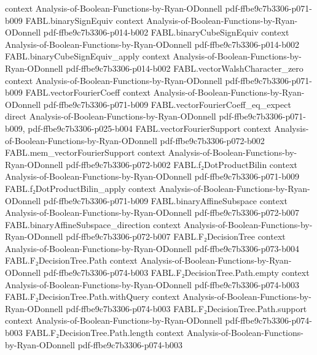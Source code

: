 \begin{theorem}
  {context}
  {Analysis-of-Boolean-Functions-by-Ryan-ODonnell}
  {pdf-ffbe9c7b3306-p071-b009}
\proofstep
  {FABL.binarySignEquiv}
  {context}
  {Analysis-of-Boolean-Functions-by-Ryan-ODonnell}
  {pdf-ffbe9c7b3306-p014-b002}
\proofstep
  {FABL.binaryCubeSignEquiv}
  {context}
  {Analysis-of-Boolean-Functions-by-Ryan-ODonnell}
  {pdf-ffbe9c7b3306-p014-b002}
\proofstep
  {FABL.binaryCubeSignEquiv_apply}
  {context}
  {Analysis-of-Boolean-Functions-by-Ryan-ODonnell}
  {pdf-ffbe9c7b3306-p014-b002}
\proofstep
  {FABL.vectorWalshCharacter_zero}
  {context}
  {Analysis-of-Boolean-Functions-by-Ryan-ODonnell}
  {pdf-ffbe9c7b3306-p071-b009}
\proofstep
  {FABL.vectorFourierCoeff}
  {context}
  {Analysis-of-Boolean-Functions-by-Ryan-ODonnell}
  {pdf-ffbe9c7b3306-p071-b009}
\proofstep
  {FABL.vectorFourierCoeff_eq_expect}
  {direct}
  {Analysis-of-Boolean-Functions-by-Ryan-ODonnell}
  {pdf-ffbe9c7b3306-p071-b009,
    pdf-ffbe9c7b3306-p025-b004}
\proofstep
  {FABL.vectorFourierSupport}
  {context}
  {Analysis-of-Boolean-Functions-by-Ryan-ODonnell}
  {pdf-ffbe9c7b3306-p072-b002}
\proofstep
  {FABL.mem_vectorFourierSupport}
  {context}
  {Analysis-of-Boolean-Functions-by-Ryan-ODonnell}
  {pdf-ffbe9c7b3306-p072-b002}
\proofstep
  {FABL.f₂DotProductBilin}
  {context}
  {Analysis-of-Boolean-Functions-by-Ryan-ODonnell}
  {pdf-ffbe9c7b3306-p071-b009}
\proofstep
  {FABL.f₂DotProductBilin_apply}
  {context}
  {Analysis-of-Boolean-Functions-by-Ryan-ODonnell}
  {pdf-ffbe9c7b3306-p071-b009}
\proofstep
  {FABL.binaryAffineSubspace}
  {context}
  {Analysis-of-Boolean-Functions-by-Ryan-ODonnell}
  {pdf-ffbe9c7b3306-p072-b007}
\proofstep
  {FABL.binaryAffineSubspace_direction}
  {context}
  {Analysis-of-Boolean-Functions-by-Ryan-ODonnell}
  {pdf-ffbe9c7b3306-p072-b007}
\proofstep
  {FABL.F₂DecisionTree}
  {context}
  {Analysis-of-Boolean-Functions-by-Ryan-ODonnell}
  {pdf-ffbe9c7b3306-p073-b004}
\proofstep
  {FABL.F₂DecisionTree.Path}
  {context}
  {Analysis-of-Boolean-Functions-by-Ryan-ODonnell}
  {pdf-ffbe9c7b3306-p074-b003}
\proofstep
  {FABL.F₂DecisionTree.Path.empty}
  {context}
  {Analysis-of-Boolean-Functions-by-Ryan-ODonnell}
  {pdf-ffbe9c7b3306-p074-b003}
\proofstep
  {FABL.F₂DecisionTree.Path.withQuery}
  {context}
  {Analysis-of-Boolean-Functions-by-Ryan-ODonnell}
  {pdf-ffbe9c7b3306-p074-b003}
\proofstep
  {FABL.F₂DecisionTree.Path.support}
  {context}
  {Analysis-of-Boolean-Functions-by-Ryan-ODonnell}
  {pdf-ffbe9c7b3306-p074-b003}
\proofstep
  {FABL.F₂DecisionTree.Path.length}
  {context}
  {Analysis-of-Boolean-Functions-by-Ryan-ODonnell}
  {pdf-ffbe9c7b3306-p074-b003}
\proofstep

\end{theorem}
